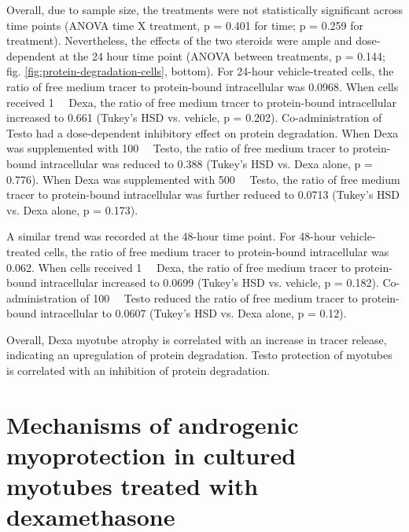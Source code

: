 \documentclass[12pt,english]{report}\usepackage[]{graphicx}\usepackage[]{color}
\begin{document}
Overall, due to sample size, the treatments were not statistically
significant across time points (ANOVA time X treatment, p = 0.401
for time; p = 0.259
for treatment). Nevertheless, the effects of the two steroids were
ample and dose-dependent at the 24 hour time point (ANOVA between
treatments, p = 0.144;
fig. \ref{fig:protein-degradation-cells}, bottom). For 24-hour vehicle-treated
cells, the ratio of free medium tracer to protein-bound intracellular
was 0.0968.
When cells received \SI{1}{\micro\molar}  Dexa, the ratio of free
medium tracer to protein-bound intracellular increased to 0.661
(Tukey's HSD vs. vehicle, p = 0.202).
Co-administration of Testo had a dose-dependent inhibitory effect
on protein degradation. When Dexa was supplemented with \SI{100}{\nano\molar}
Testo, the ratio of free medium tracer to protein-bound intracellular
was reduced to 0.388
(Tukey's HSD vs. Dexa alone, p = 0.776).
When Dexa was supplemented with \SI{500}{\nano\molar} Testo, the
ratio of free medium tracer to protein-bound intracellular was further
reduced to 0.0713
(Tukey's HSD vs. Dexa alone, p = 0.173).

A similar trend was recorded at the 48-hour time point. For 48-hour
vehicle-treated cells, the ratio of free medium tracer to protein-bound
intracellular was 0.062.
When cells received \SI{1}{\micro\molar} Dexa, the ratio of free
medium tracer to protein-bound intracellular increased to 0.0699
(Tukey's HSD vs. vehicle, p = 0.182).
Co-administration of \SI{100}{\nano\molar} Testo reduced the ratio
of free medium tracer to protein-bound intracellular to 0.0607
(Tukey's HSD vs. Dexa alone, p = 0.12).

Overall, Dexa myotube atrophy is correlated with an increase in tracer
release, indicating an upregulation of protein degradation. Testo
protection of myotubes is correlated with an inhibition of protein
degradation.


\section{Mechanisms of androgenic myoprotection in cultured myotubes treated
with dexamethasone}
\end{document}
